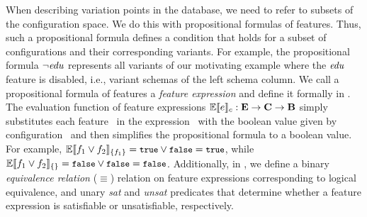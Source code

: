 When describing variation points in the database, we need to 
refer to subsets of the configuration space. We do this with
propositional formulas of features.
Thus, 
such a propositional formula defines a condition that holds for 
a subset of configurations and their corresponding variants. 
%
%
For example, the propositional formula $\neg \edu$ represents all variants of
our motivating example where the $\edu$ feature is disabled, i.e., variant
schemas of the  left schema column. 
%
We call a propositional formula of features a \emph{feature expression} and define
it formally in . 
The evaluation function of feature expressions 
$\fSem \dimMeta : \ffSet \to \confSet \to \bSet$ simply substitutes each
feature \fName\ in the expression \dimMeta\ with the boolean value 
given by configuration \config\ and then
simplifies the propositional formula to a boolean value.
For example, 
$\fSem [\{\A\}] {\A \vee \B} = \t \vee \f = \t$, while
$\fSem [\{\}] {\A \vee \B} = \f \vee \f = \f$.
Additionally, in , we define a binary \emph{equivalence
relation} ($\equiv$) relation on feature expressions corresponding to logical
equivalence, and unary \emph{sat} and \emph{unsat} predicates that determine
whether a feature expression is satisfiable or unsatisfiable, respectively.
%

